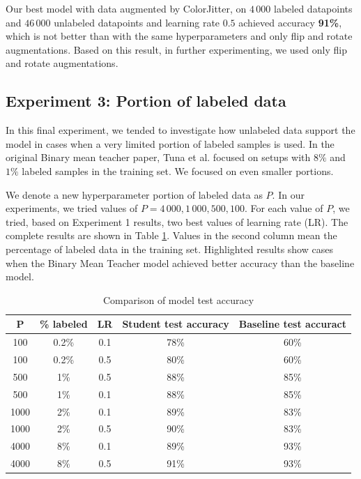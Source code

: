 Our best model with data augmented by ColorJitter, on $4\,000$ labeled datapoints and $46\,000$ unlabeled datapoints and learning rate $0.5$ achieved accuracy \textbf{91\%}, which is not better than with the same hyperparameters and only flip and rotate augmentations. Based on this result, in further experimenting, we used only flip and rotate augmentations.





\subsection{Experiment 3: Portion of labeled data}

In this final experiment, we tended to investigate how unlabeled data support the model in cases when a very limited portion of labeled samples is used.
In the original Binary mean teacher paper, Tuna et al.\cite{tuna-bmt} focused on setups with $8\%$ and $1\%$ labeled samples in the training set. We focused on even smaller portions.

We denote a new hyperparameter portion of labeled data as $P$. In our experiments, we tried values of $P = 4\,000, 1\,000, 500, 100$. For each value of $P$, we tried, based on Experiment 1 results, two best values of learning rate (LR). The complete results are shown in Table \ref{portions}. Values in the second column mean the percentage of labeled data in the training set. Highlighted results show cases when the Binary Mean Teacher model achieved better accuracy than the baseline model.

\bigskip

\begin{table}[h]
    \centering
    \begin{tabular}{ |c|c|c|c|c|} 
     \hline

     P & \% labeled & LR & Student test accuracy & Baseline test accuract\\
     \hline
     
     100 & 0.2\%& 0.1 & \color{purple}  78\%   &  60\% \\ 
     \hline
     100 & 0.2\% & 0.5 & \color{purple} 80\%  & 60\% \\
     \hline
     500 & 1\% & 0.5 & \color{purple} 88\% &  85\% \\
     \hline
     500 & 1\% & 0.1 & \color{purple} 88\% &  85\% \\
     \hline
     1000 & 2\% & 0.1 & \color{purple}89\% &  83\% \\
     \hline
     1000 & 2\% & 0.5 & \color{purple}90\% &  83\%  \\
     \hline
     4000 & 8\% & 0.1 & 89\% & 93\% \\
     \hline
     4000 & 8\% & 0.5 & 91\% & 93\%  \\
     
     \hline
    \end{tabular}
    \caption{Comparison of model test accuracy}
    \label{portions}
\end{table}


